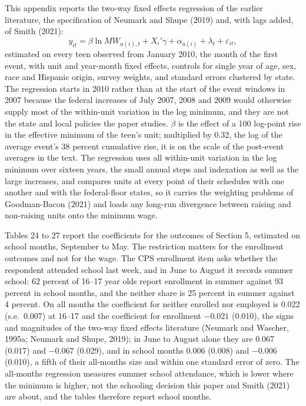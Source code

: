 \documentclass[12pt]{article}
\begin{document}
This appendix reports the two-way fixed effects regression of the earlier literature, the specification of Neumark and Shupe (2019) and, with lags added, of Smith (2021):
\begin{equation}
y_{it} = \beta \ln MW_{u(i),t} + X_i'\gamma + \alpha_{u(i)} + \lambda_t + \varepsilon_{it},

\end{equation}
estimated on every teen observed from January 2010, the month of the first event, with unit and year-month fixed effects, controls for single year of age, sex, race and Hispanic origin, survey weights, and standard errors clustered by state. The regression starts in 2010 rather than at the start of the event windows in 2007 because the federal increases of July 2007, 2008 and 2009 would otherwise supply most of the within-unit variation in the log minimum, and they are not the state and local policies the paper studies. $\beta$ is the effect of a 100 log-point rise in the effective minimum of the teen's unit; multiplied by 0.32, the log of the average event's 38 percent cumulative rise, it is on the scale of the post-event averages in the text. The regression uses all within-unit variation in the log minimum over sixteen years, the small annual steps and indexation as well as the large increases, and compares units at every point of their schedules with one another and with the federal-floor states, so it carries the weighting problems of Goodman-Bacon (2021) and loads any long-run divergence between raising and non-raising units onto the minimum wage.

Tables 24 to 27 report the coefficients for the outcomes of Section 5, estimated on school months, September to May. The restriction matters for the enrollment outcomes and not for the wage. The CPS enrollment item asks whether the respondent attended school last week, and in June to August it records summer school: 62 percent of 16--17 year olds report enrollment in summer against 93 percent in school months, and the neither share is 25 percent in summer against 4 percent. On all months the coefficient for neither enrolled nor employed is 0.022 (s.e.\ 0.007) at 16--17 and the coefficient for enrollment $-0.021$ (0.010), the signs and magnitudes of the two-way fixed effects literature (Neumark and Wascher, 1995a; Neumark and Shupe, 2019); in June to August alone they are 0.067 (0.017) and $-0.067$ (0.029), and in school months 0.006 (0.008) and $-0.006$ (0.010), a fifth of their all-months size and within one standard error of zero. The all-months regression measures summer school attendance, which is lower where the minimum is higher, not the schooling decision this paper and Smith (2021) are about, and the tables therefore report school months.
\end{document}
